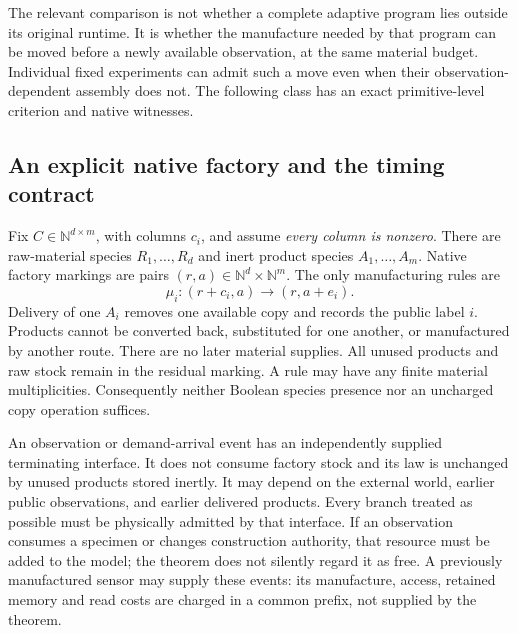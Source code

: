 \documentclass[11pt]{article}
\theoremstyle{definition}
\theoremstyle{remark}
\begin{document}
The relevant comparison is not whether a complete adaptive program lies
outside its original runtime. It is whether the manufacture needed by that
program can be moved before a newly available observation, at the same
material budget. Individual fixed experiments can admit such a move even
when their observation-dependent assembly does not. The following class
has an exact primitive-level criterion and native witnesses.

\subsection{An explicit native factory and the timing contract}
Fix $C\in\mathbb N^{d\times m}$, with columns $c_i$, and assume
\emph{every column is nonzero}. There are raw-material species
$R_1,\ldots,R_d$ and inert product species $A_1,\ldots,A_m$. Native
factory markings are pairs $(r,a)\in\mathbb N^d\times\mathbb N^m$.
The only manufacturing rules are
\[
 \mu_i:(r+c_i,a)\longrightarrow(r,a+e_i).
\]
Delivery of one $A_i$ removes one available copy and records the public
label $i$. Products cannot be converted back, substituted for one another,
or manufactured by another route. There are no later material supplies.
All unused products and raw stock remain in the residual marking.
A rule may have any finite material multiplicities. Consequently neither
Boolean species presence nor an uncharged copy operation suffices.

An observation or demand-arrival event has an independently supplied
terminating interface. It does not consume factory stock and its law is
unchanged by unused products stored inertly. It may depend on the external
world, earlier public observations, and earlier delivered products.
Every branch treated as possible must be physically admitted by that
interface. If an observation consumes a specimen or changes construction
authority, that resource must be added to the model; the theorem does not
silently regard it as free. A previously manufactured sensor may supply
these events: its manufacture, access, retained memory and read costs are
charged in a common prefix, not supplied by the theorem.
\end{document}
